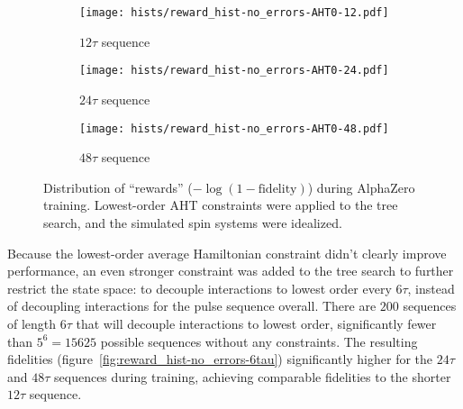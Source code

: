 \begin{figure}[H]
    \centering
    \begin{subfigure}{.49\textwidth}
        \centering
        \texttt{[image: hists/reward\_hist-no\_errors-AHT0-12.pdf]}
        \caption{$12\tau$ sequence}
        \label{fig:reward_hist-no_errors-AHT0-12}
    \end{subfigure}
    \begin{subfigure}{.49\textwidth}
        \centering
        \texttt{[image: hists/reward\_hist-no\_errors-AHT0-24.pdf]}
        \caption{$24\tau$ sequence}
        \label{fig:reward_hist-no_errors-AHT0-24}
    \end{subfigure}
    \begin{subfigure}{.49\textwidth}
        \centering
        \texttt{[image: hists/reward\_hist-no\_errors-AHT0-48.pdf]}
        \caption{$48\tau$ sequence}
        \label{fig:reward_hist-no_errors-AHT0-48}
    \end{subfigure}
    \caption{Distribution of ``rewards'' ($-\log(1 - \text{fidelity})$) during AlphaZero training. Lowest-order AHT constraints were applied to the tree search, and the simulated spin systems were idealized.}
    \label{fig:reward_hist-no_errors-AHT0}
\end{figure}


Because the lowest-order average Hamiltonian constraint didn't clearly improve performance, an even stronger constraint was added to the tree search to further restrict the state space: to decouple interactions to lowest order every $6\tau$, instead of decoupling interactions for the pulse sequence overall.
There are $200$ sequences of length $6\tau$ that will decouple interactions to lowest order, significantly fewer than $5^6 = 15625$ possible sequences without any constraints. The resulting fidelities (figure~\ref{fig:reward_hist-no_errors-6tau}) significantly higher for the $24\tau$ and $48\tau$ sequences during training, achieving comparable fidelities to the shorter $12\tau$ sequence.

